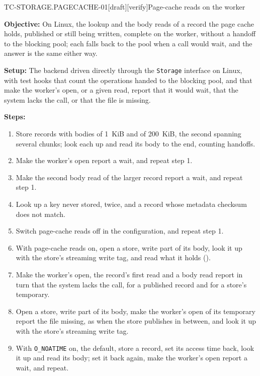 \begin{requirement}{TC-STORAGE.PAGECACHE-01}[draft][verify]{Page-cache reads on the worker}


  \textbf{Objective:} On Linux, the lookup and the body reads of a record
  the page cache holds, published or still being written, complete on the
  worker, without a handoff to the blocking pool; each falls back to the
  pool when a call would wait, and the answer is the same either way.

  \textbf{Setup:} The backend driven directly through the \texttt{Storage}
  interface on Linux, with test hooks that count the operations handed to the
  blocking pool, and that make the worker's open, or a given read, report
  that it would wait, that the system lacks the call, or that the file is
  missing.

  \textbf{Steps:}
  \begin{enumerate}
    \item Store records with bodies of 1~KiB and of 200~KiB, the second
      spanning several chunks; look each up and read its body to the end,
      counting handoffs.
    \item Make the worker's open report a wait, and repeat step 1.
    \item Make the second body read of the larger record report a wait, and
      repeat step 1.
    \item Look up a key never stored, twice, and a record whose metadata
      checksum does not match.
    \item Switch page-cache reads off in the configuration, and repeat
      step 1.
    \item With page-cache reads on, open a store, write part of its body,
      look it up with the store's streaming write tag, and read what it
      holds ().
    \item Make the worker's open, the record's first read and a body read
      report in turn that the system lacks the call, for a published record
      and for a store's temporary.
    \item Open a store, write part of its body, make the worker's open of its
      temporary report the file missing, as when the store publishes in
      between, and look it up with the store's streaming write tag.
    \item With \texttt{O\_NOATIME} on, the default, store a record, set its
      access time back, look it up and read its body; set it back again,
      make the worker's open report a wait, and repeat.
  \end{enumerate}


\end{requirement}

